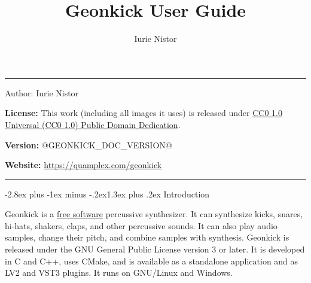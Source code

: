 \documentclass[11pt]{article}
\title{Geonkick User Guide}
\author{Iurie Nistor}
\date{}
\makeatletter
\renewcommand{\section}{\@startsection{section}{1}{\z@}%
  {-2.8ex plus -1ex minus -.2ex}{1.3ex plus .2ex}%
  {\normalfont\Large\bfseries\sffamily\color{GKBlue}}}
\makeatother
\begin{document}
\hypersetup{pageanchor=false}
\makeatletter
\begin{titlepage}
\thispagestyle{empty}
\color{GKInk}
\vspace*{1.2cm}
\noindent\textcolor{GKAccent}{\rule{3.2cm}{3pt}}

\vspace{1.4cm}
\begin{flushleft}
{\sffamily\bfseries\fontsize{32}{38}\selectfont\color{GKBlue}\@title\par}
\vspace{0.5cm}
{\sffamily\Large\color{GKMuted}Author: Iurie Nistor\par}
\end{flushleft}

\vspace{1.3cm}
\noindent\colorbox{GKLight}{%
  \parbox{\dimexpr\textwidth-2\fboxsep\relax}{%
    \vspace{0.35cm}
    \textbf{License:} This work (including all images it uses) is released
    under
    \href{https://creativecommons.org/publicdomain/zero/1.0/deed.en}{CC0 1.0
    Universal (CC0 1.0) Public Domain Dedication}.\par
    \vspace{0.25cm}
    \textbf{Version:} @GEONKICK_DOC_VERSION@\par
    \vspace{0.25cm}
    \textbf{Website:} \url{https://quamplex.com/geonkick}
    \vspace{0.35cm}
  }}
\vfill
\noindent\textcolor{GKAccent}{\rule{\textwidth}{1pt}}
\end{titlepage}
\makeatother
\hypersetup{pageanchor=true}
\small
\tableofcontents
\normalsize
\clearpage
{}

\section{Introduction}\label{introduction}

Geonkick is a \href{https://www.gnu.org/philosophy/free-sw.en.html}{free
software} percussive synthesizer. It can synthesize kicks, snares,
hi-hats, shakers, claps, and other percussive sounds. It can also play
audio samples, change their pitch, and combine samples with synthesis.
Geonkick is released under the GNU General Public License version 3 or
later. It is developed in C and C++, uses CMake, and is available as a
standalone application and as LV2 and VST3 plugins. It runs on GNU/Linux
and Windows.
\end{document}

